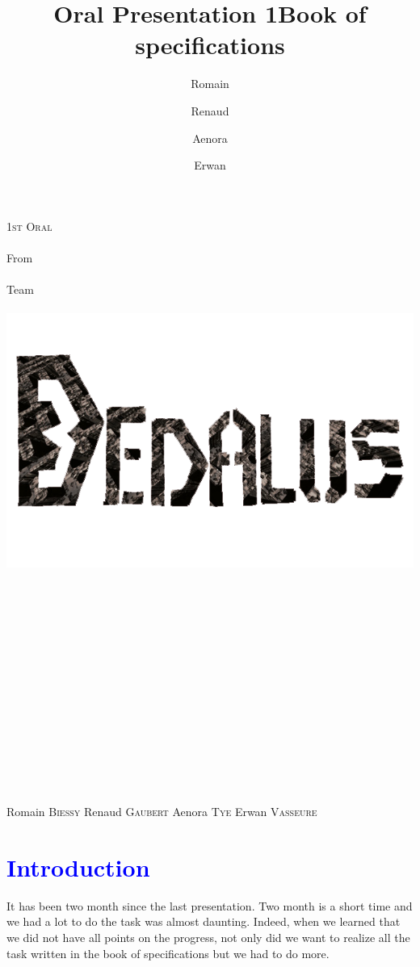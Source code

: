 \documentclass[article]{report}             %
\title {Oral Presentation 1}
\title {Book of specifications}
\author {Romain\and Renaud\and Aenora\and Erwan}
\date {}
\begin{document}
	\thispagestyle{empty}
  	\begin{titlepage} 
		\vspace*{1cm} 
  		\begin{center} 
  			{\huge{\textsc{1st Oral} \\ ~ \\{\large From}\\ ~\\ Team \\  ~ \\ }}
	  		\includegraphics[width = 14cm]{images/Titles/Dedalus.png}
			\\ ~ \\ ~ \\ ~ \\ ~ \\ ~ \\ ~ \\ ~ \\ ~ \\ ~ \\ ~ \\ ~ \\ ~ \\ ~ \\ ~ 
		\end{center}
  		\hfill {\large Romain \textsc{Biessy}}
  		\hfill {\large Renaud \textsc{Gaubert}}
  		\hfill {\large Aenora \textsc{Tye}}
  		\hfill {\large Erwan  \textsc{Vasseure}}
  	\end{titlepage} 

  	\tableofcontents
  		\newpage
		
		\chapter{\textcolor{blue}{Introduction}}
 			It has been two month since the last presentation. Two month is a short time and we had a lot to do the task was almost daunting. Indeed, when we learned that we did not have all points on the progress, not only did we want to realize all the task written in the book of specifications but we had to do more. \\
\end{document}
